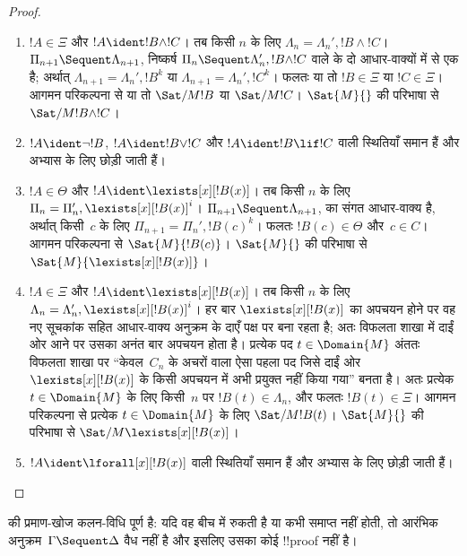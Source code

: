 \documentclass[../../../include/open-logic-section]{subfiles}
\begin{document}
\begin{proof}
\begin{enumerate}
  \item $!A \in \Xi$ और $!A \ident !B \land !C$। तब किसी $n$ के लिए
  $\Lambda_n = \Lambda_n', !B \land !C$। $\Pi_{n+1} \Sequent
  \Lambda_{n+1}$, निष्कर्ष $\Pi_n \Sequent \Lambda'_n, !B \land !C$ वाले
  \RightR{\land} के दो आधार-वाक्यों में से एक है; अर्थात् $\Lambda_{n+1} =
  \Lambda_n', !B^k$ या $\Lambda_{n+1} = \Lambda_n', !C^k$। फलतः या तो $!B
  \in \Xi$ या $!C \in \Xi$। आगमन परिकल्पना से या तो $\Sat/{M}{!B}$ या
  $\Sat/{M}{!C}$। $\Sat{M}{}$ की परिभाषा से $\Sat/{M}{!B \land !C}$।
  
  \item $!A \ident \lnot !B$, $!A \ident !B \lor !C$ और $!A \ident !B
  \lif !C$ वाली स्थितियाँ समान हैं और अभ्यास के लिए छोड़ी जाती हैं।

  \item $!A \in \Theta$ और $!A \ident \lexists[x][!B(x)]$। तब किसी $n$ के
  लिए $\Pi_n = \Pi_n', \lexists[x][!B(x)]^i$। $\Pi_{n+1} \Sequent
  \Lambda_{n+1}$, \LeftR{\lexists} का संगत आधार-वाक्य है, अर्थात् किसी~$c$
  के लिए $\Pi_{n+1} = \Pi_n', !B(c)^k$। फलतः $!B(c) \in \Theta$ और~$c \in
  C$। आगमन परिकल्पना से $\Sat{M}{!B(c)}$। $\Sat{M}{}$ की परिभाषा से
  $\Sat{M}{\lexists[x][!B(x)]}$।

  \item $!A \in \Xi$ और $!A \ident \lexists[x][!B(x)]$। तब किसी $n$ के
  लिए $\Lambda_n = \Lambda_n', \lexists[x][!B(x)]^i$। हर बार
  $\lexists[x][!B(x)]$ का अपचयन होने पर वह नए सूचकांक सहित आधार-वाक्य अनुक्रम
  के दाएँ पक्ष पर बना रहता है; अतः विफलता शाखा में दाईं ओर आने पर उसका अनंत
  बार अपचयन होता है। प्रत्येक पद $t \in \Domain{M}$ अंततः विफलता शाखा पर
  ``केवल~$C_n$ के अचरों वाला ऐसा पहला पद जिसे दाईं ओर $\lexists[x][!B(x)]$
  के किसी अपचयन में अभी प्रयुक्त नहीं किया गया'' बनता है। अतः प्रत्येक $t \in
  \Domain{M}$ के लिए किसी~$n$ पर $!B(t) \in \Lambda_n$, और फलतः $!B(t) \in
  \Xi$। आगमन परिकल्पना से प्रत्येक $t \in \Domain{M}$ के लिए
  $\Sat/{M}{!B(t)}$। $\Sat{M}{}$ की परिभाषा से
  $\Sat/{M}{\lexists[x][!B(x)]}$।

  \item $!A \ident \lforall[x][!B(x)]$ वाली स्थितियाँ समान हैं और अभ्यास के
  लिए छोड़ी जाती हैं।
\end{enumerate}
\end{proof}

\begin{cor}
 की प्रमाण-खोज कलन-विधि पूर्ण है: यदि वह बीच में रुकती है या कभी
समाप्त नहीं होती, तो आरंभिक अनुक्रम~$\Gamma \Sequent \Delta$ वैध नहीं है और
इसलिए उसका कोई !!{proof} नहीं है।
\end{cor}
\end{document}
